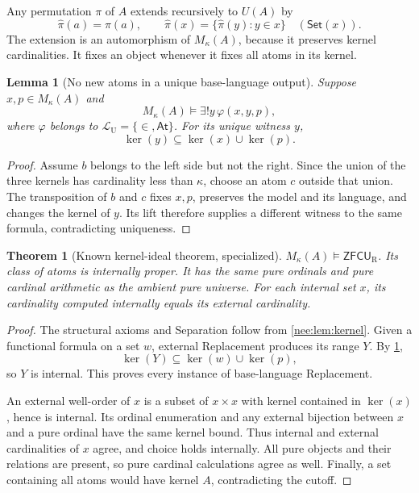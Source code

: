 \documentclass[11pt,letterpaper]{article}
\numberwithin{equation}{section}
\theoremstyle{plain}
\newtheorem{theorem}{Theorem}[section]
\newtheorem{lemma}[lemma]{Lemma}
\theoremstyle{definition}
\theoremstyle{remark}
\newcommand{\At}{\mathsf{At}}
\newcommand{\Set}{\mathsf{Set}}
\newcommand{\ZFCUR}{\mathsf{ZFCU}_{\mathrm R}}
\newcommand{\kerat}{\operatorname{ker}}
\newcommand{\Lang}{\mathcal L_{\mathrm U}}
\begin{document}
Any permutation $\pi$ of $A$ extends recursively to $U(A)$ by
\[
\widehat\pi(a)=\pi(a),\qquad
\widehat\pi(x)=\{\widehat\pi(y):y\in x\}\quad(\Set(x)).
\]
The extension is an automorphism of $M_\kappa(A)$, because it preserves kernel cardinalities. It fixes an object whenever it fixes all atoms in its kernel.

\begin{lemma}[No new atoms in a unique base-language output]\label{nee:lem:nonew}
Suppose $x,p\in M_\kappa(A)$ and
\[
M_\kappa(A)\models\exists!y\,\varphi(x,y,p),
\]
where $\varphi$ belongs to $\Lang=\{\in,\At\}$. For its unique witness $y$,
\[
\kerat(y)\subseteq\kerat(x)\cup\kerat(p).
\]
\end{lemma}
\begin{proof}
Assume $b$ belongs to the left side but not the right. Since the union of the three kernels has cardinality less than $\kappa$, choose an atom $c$ outside that union. The transposition of $b$ and $c$ fixes $x,p$, preserves the model and its language, and changes the kernel of $y$. Its lift therefore supplies a different witness to the same formula, contradicting uniqueness.
\end{proof}

\begin{theorem}[Known kernel-ideal theorem, specialized]\label{nee:thm:base}
$M_\kappa(A)\models\ZFCUR$. Its class of atoms is internally proper. It has the same pure ordinals and pure cardinal arithmetic as the ambient pure universe. For each internal set $x$, its cardinality computed internally equals its external cardinality.
\end{theorem}
\begin{proof}
The structural axioms and Separation follow from \cref{nee:lem:kernel}. Given a functional formula on a set $w$, external Replacement produces its range $Y$. By \cref{nee:lem:nonew},
\[
\kerat(Y)\subseteq\kerat(w)\cup\kerat(p),
\]
so $Y$ is internal. This proves every instance of base-language Replacement.

An external well-order of $x$ is a subset of $x\times x$ with kernel contained in $\kerat(x)$, hence is internal. Its ordinal enumeration and any external bijection between $x$ and a pure ordinal have the same kernel bound. Thus internal and external cardinalities of $x$ agree, and choice holds internally. All pure objects and their relations are present, so pure cardinal calculations agree as well. Finally, a set containing all atoms would have kernel $A$, contradicting the cutoff.
\end{proof}
\end{document}
